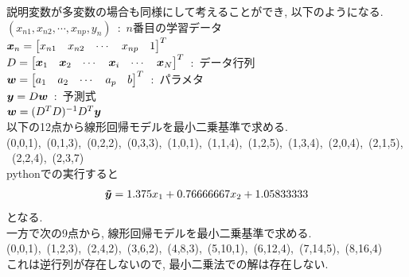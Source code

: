 \documentclass[dvipdfmx,a4j]{jsarticle}
\begin{document}
          説明変数が多変数の場合も同様にして考えることができ, 以下のようになる.\\
          $(x_{n1},x_{n2},\cdots,x_{np},y_{n})$\ :\ $n$番目の学習データ\\
        $\mbox{\boldmath $x$}_{n} = \begin{bmatrix}x_{n1}&x_{n2}&\cdots &x_{np}&1\end{bmatrix}^{T}$\\
        $D=\begin{bmatrix}\mbox{\boldmath $x$}_{1}&\mbox{\boldmath $x$}_{2}&\cdots &\mbox{\boldmath $x$}_{i}&\cdots&\mbox{\boldmath $x$}_{N}\end{bmatrix}^{T}$\ :\ データ行列\\
          $\mbox{\boldmath $w$}=\begin{bmatrix}a_{1}&a_{2}&\cdots &a_{p}&b \end{bmatrix}^{T}$\ :\ パラメタ\\
            $\mbox{\boldmath $y$} = D\mbox{\boldmath $w$}$\ :\ 予測式\\
            $\mbox{\boldmath $w$}=(D^{T}D)^{-1}D^{T}\mbox{\boldmath $y$}$\\[1cm]
            以下の12点から線形回帰モデルを最小二乗基準で求める.\\
          (0,0,1),\ (0,1,3),\ (0,2,2),\ (0,3,3),\ (1,0,1),\ (1,1,4),\ (1,2,5),\ (1,3,4),\ (2,0,4),\ (2,1,5),\ (2,2,4),\ (2,3,7)\\[1cm]
          pythonでの実行すると
          \begin{eqnarray*}
            \mbox{\boldmath $\tilde{y}$} = 1.375x_{1}+0.76666667x_{2}+1.05833333
          \end{eqnarray*}
          となる.\\
          一方で次の9点から, 線形回帰モデルを最小二乗基準で求める.\\
          (0,0,1),\ (1,2,3),\ (2,4,2),\ (3,6,2),\ (4,8,3),\ (5,10,1),\ (6,12,4),\ (7,14,5),\ (8,16,4)\\[1cm]
          これは逆行列が存在しないので, 最小二乗法での解は存在しない.\\
\end{document}
